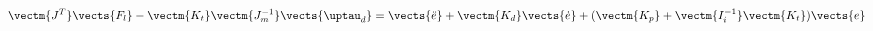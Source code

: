 \setlength{\arraycolsep}{0.0em}
\begin{equation}
\label{JTFC2_error_equation2}
\vectm{J^T} \vects{F_l} - \vectm{K_t} \vectm{J^{-1}_m} \vects{\uptau_d} = \vects{\ddot{e}} + \vectm{K_d} \vects{\dot{e}} + (\vectm{K_p} + \vectm{I^{-1}_i} \vectm{K_t}) \vects{e}
\end{equation}
\setlength{\arraycolsep}{5pt}


%
%
%

%
